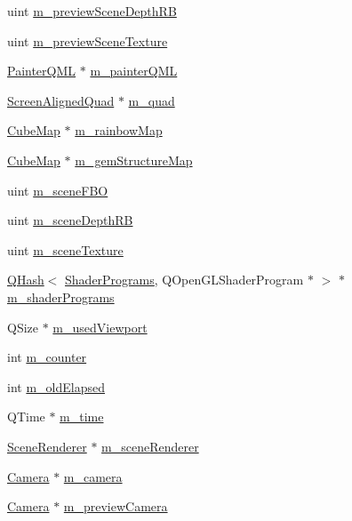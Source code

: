 \begin{DoxyCompactItemize}
uint \hyperlink{class_painter_ad4fb3338a366abb5592996572afa070d}{m\+\_\+preview\+Scene\+Depth\+R\+B}
\item 
uint \hyperlink{class_painter_aff56d277a464801c66a7f7414ef86733}{m\+\_\+preview\+Scene\+Texture}
\item 
\hyperlink{class_painter_q_m_l}{Painter\+Q\+M\+L} $\ast$ \hyperlink{class_painter_af2774293bfaf6f654cb01e504937abb8}{m\+\_\+painter\+Q\+M\+L}
\item 
\hyperlink{class_screen_aligned_quad}{Screen\+Aligned\+Quad} $\ast$ \hyperlink{class_painter_a50f7fad2d44554f0be878a96afacfa44}{m\+\_\+quad}
\item 
\hyperlink{class_cube_map}{Cube\+Map} $\ast$ \hyperlink{class_painter_a9f99a5ccb9b1b645281b1439cbf416e1}{m\+\_\+rainbow\+Map}
\item 
\hyperlink{class_cube_map}{Cube\+Map} $\ast$ \hyperlink{class_painter_abd540fa99df6acea8eb32c3bcfb81773}{m\+\_\+gem\+Structure\+Map}
\item 
uint \hyperlink{class_painter_a4df95c88604785d7eecaf1474df67629}{m\+\_\+scene\+F\+B\+O}
\item 
uint \hyperlink{class_painter_a92db0cde0f42dd82569e85785850c283}{m\+\_\+scene\+Depth\+R\+B}
\item 
uint \hyperlink{class_painter_af82c25060227ea6ec91ae60f0753c593}{m\+\_\+scene\+Texture}
\item 
\hyperlink{class_q_hash}{Q\+Hash}$<$ \hyperlink{shaderprograms_8h_ada89718f8d394b2cc093eb9770c554ff}{Shader\+Programs}, Q\+Open\+G\+L\+Shader\+Program $\ast$ $>$ $\ast$ \hyperlink{class_painter_a30655a30ba8f540f0e28b976b97d126f}{m\+\_\+shader\+Programs}
\item 
Q\+Size $\ast$ \hyperlink{class_painter_aff5d274eb90d7a94565effe5bd5d03f7}{m\+\_\+used\+Viewport}
\item 
int \hyperlink{class_painter_a1a3de21931e9796db399252b7336169c}{m\+\_\+counter}
\item 
int \hyperlink{class_painter_aedfda3eb1a37f4f121291c558786492a}{m\+\_\+old\+Elapsed}
\item 
Q\+Time $\ast$ \hyperlink{class_painter_ab6976ab19027866bbb01e9a1504aa5c9}{m\+\_\+time}
\item 
\hyperlink{class_scene_renderer}{Scene\+Renderer} $\ast$ \hyperlink{class_painter_a574ba64fd2af1d8c64d2c293d4811fc2}{m\+\_\+scene\+Renderer}
\item 
\hyperlink{class_camera}{Camera} $\ast$ \hyperlink{class_painter_a05558ea7a2f818641e0506d01d518010}{m\+\_\+camera}
\item 
\hyperlink{class_camera}{Camera} $\ast$ \hyperlink{class_painter_a237399ac0b5da625eb19de1ae3c0a236}{m\+\_\+preview\+Camera}
\end{DoxyCompactItemize}


